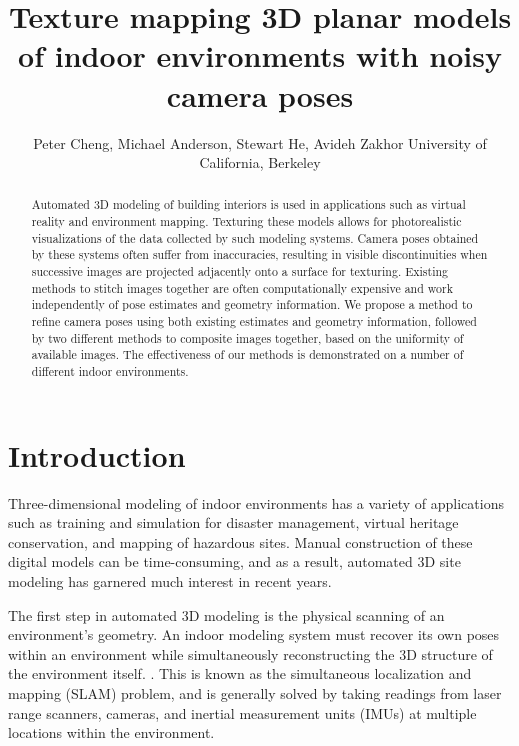 \documentclass[]{spie}  %
\title{Texture mapping 3D planar models of indoor environments with noisy camera poses}
\author{Peter Cheng, Michael Anderson, Stewart He, Avideh Zakhor
\skiplinehalf
University of California, Berkeley\\
}
\begin{document}
\maketitle

\begin{abstract}

  Automated 3D modeling of building interiors is used in applications
  such as virtual reality and environment mapping. Texturing these
  models allows for photorealistic visualizations of the data
  collected by such modeling systems. Camera poses obtained by these
  systems often suffer from inaccuracies, resulting in visible
  discontinuities when successive images are projected adjacently onto
  a surface for texturing. Existing methods to stitch images together
  are often computationally expensive and work independently of pose
  estimates and geometry information. We propose a method to refine
  camera poses using both existing estimates and geometry information,
  followed by two different methods to composite images together,
  based on the uniformity of available images. The effectiveness of
  our methods is demonstrated on a number of different indoor
  environments.
\end{abstract}



\section{Introduction}
\label{sec:introduction} %

Three-dimensional modeling of indoor environments has a variety of
applications such as training and simulation for disaster management,
virtual heritage conservation, and mapping of hazardous sites. Manual
construction of these digital models can be time-consuming, and as a
result, automated 3D site modeling has garnered much interest in
recent years.

The first step in automated 3D modeling is the physical scanning of an
environment's geometry. An indoor modeling system must recover its own
poses within an environment while simultaneously reconstructing the 3D
structure of the environment itself. \cite{chen2010indoor,
  liu2010indoor, kua2012loopclosure}. This is known as the
simultaneous localization and mapping (SLAM) problem, and is generally
solved by taking readings from laser range scanners, cameras, and
inertial measurement units (IMUs) at multiple locations within the
environment.
\end{document}
